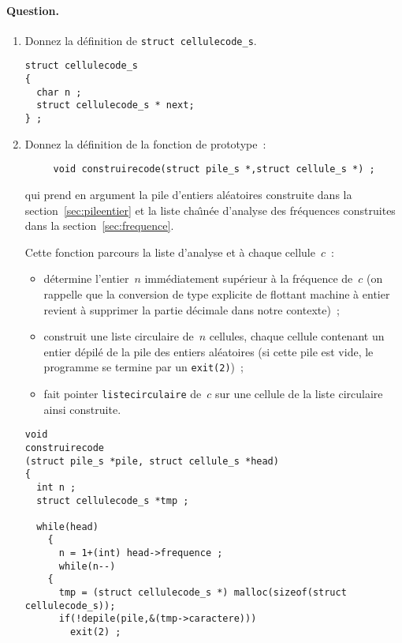 \paragraph{Question.}
\begin{enumerate}
\item Donnez la d\'efinition de \verb+struct cellulecode_s+.
\ifcorrection
\begin{correction}
\begin{verbatim}
struct cellulecode_s
{
  char n ;
  struct cellulecode_s * next;
} ;
\end{verbatim}
\end{correction}
\fi
\item Donnez la d\'efinition de la fonction de prototype~:
\begin{verbatim}
     void construirecode(struct pile_s *,struct cellule_s *) ;
\end{verbatim}
  qui prend en argument  la pile d'entiers al\'eatoires
  construite dans la section~\ref{sec:pileentier} et la liste
  cha\^\i{}n\'ee d'analyse des fr\'equences construites dans la
  section~\ref{sec:frequence}.
  \par
  Cette fonction parcours la liste d'analyse et \`a chaque
  cellule~$c$~:
  \begin{itemize}
  \item d\'etermine l'entier~$n$ imm\'ediatement sup\'erieur \`a la
    fr\'equence de~$c$ (on rappelle que la conversion de type
    explicite de flottant machine \`a entier revient \`a supprimer la
    partie d\'ecimale dans notre contexte)~;
  \item construit une liste circulaire de~$n$ cellules, chaque
    cellule contenant un entier d\'epil\'e de la pile des entiers
    al\'eatoires (si cette pile est vide, le programme se termine par
    un \verb+exit(2)+)~;
  \item fait pointer \verb+listecirculaire+ de~$c$ sur une cellule de
    la liste circulaire ainsi construite.
  \end{itemize}
\ifcorrection
  \begin{correction}
\begin{verbatim}
void 
construirecode
(struct pile_s *pile, struct cellule_s *head)
{
  int n ;
  struct cellulecode_s *tmp ;

  while(head)
    {
      n = 1+(int) head->frequence ;
      while(n--)
	{
	  tmp = (struct cellulecode_s *) malloc(sizeof(struct cellulecode_s));
	  if(!depile(pile,&(tmp->caractere)))
	    exit(2) ;


\end{verbatim}
\end{correction}
\end{enumerate}
